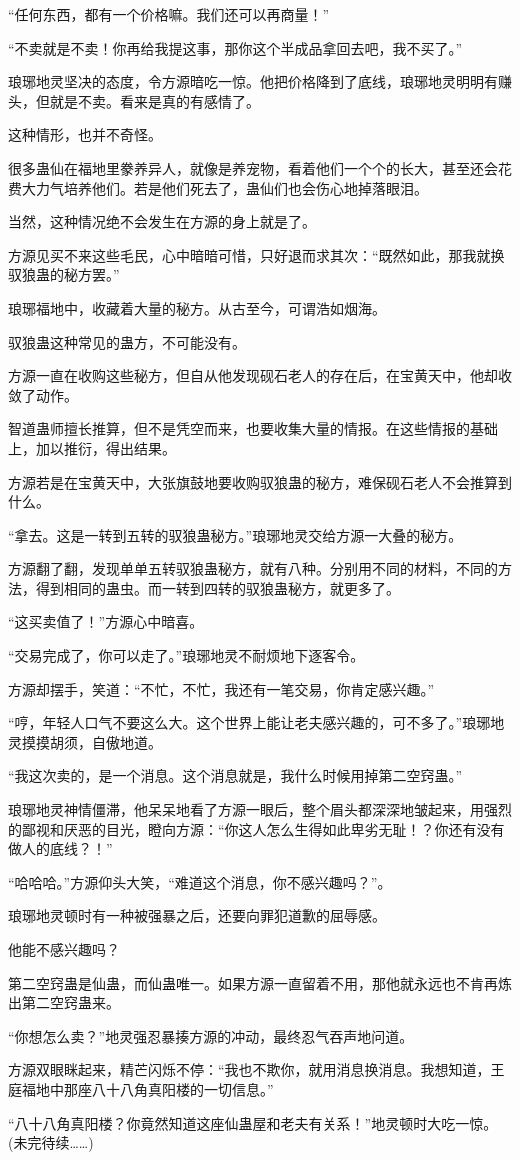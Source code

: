 \begin{this_body}
“任何东西，都有一个价格嘛。我们还可以再商量！”

“不卖就是不卖！你再给我提这事，那你这个半成品拿回去吧，我不买了。”

琅琊地灵坚决的态度，令方源暗吃一惊。他把价格降到了底线，琅琊地灵明明有赚头，但就是不卖。看来是真的有感情了。

这种情形，也并不奇怪。

很多蛊仙在福地里豢养异人，就像是养宠物，看着他们一个个的长大，甚至还会花费大力气培养他们。若是他们死去了，蛊仙们也会伤心地掉落眼泪。

当然，这种情况绝不会发生在方源的身上就是了。

方源见买不来这些毛民，心中暗暗可惜，只好退而求其次：“既然如此，那我就换驭狼蛊的秘方罢。”

琅琊福地中，收藏着大量的秘方。从古至今，可谓浩如烟海。

驭狼蛊这种常见的蛊方，不可能没有。

方源一直在收购这些秘方，但自从他发现砚石老人的存在后，在宝黄天中，他却收敛了动作。

智道蛊师擅长推算，但不是凭空而来，也要收集大量的情报。在这些情报的基础上，加以推衍，得出结果。

方源若是在宝黄天中，大张旗鼓地要收购驭狼蛊的秘方，难保砚石老人不会推算到什么。

“拿去。这是一转到五转的驭狼蛊秘方。”琅琊地灵交给方源一大叠的秘方。

方源翻了翻，发现单单五转驭狼蛊秘方，就有八种。分别用不同的材料，不同的方法，得到相同的蛊虫。而一转到四转的驭狼蛊秘方，就更多了。

“这买卖值了！”方源心中暗喜。

“交易完成了，你可以走了。”琅琊地灵不耐烦地下逐客令。

方源却摆手，笑道：“不忙，不忙，我还有一笔交易，你肯定感兴趣。”

“哼，年轻人口气不要这么大。这个世界上能让老夫感兴趣的，可不多了。”琅琊地灵摸摸胡须，自傲地道。

“我这次卖的，是一个消息。这个消息就是，我什么时候用掉第二空窍蛊。”

琅琊地灵神情僵滞，他呆呆地看了方源一眼后，整个眉头都深深地皱起来，用强烈的鄙视和厌恶的目光，瞪向方源：“你这人怎么生得如此卑劣无耻！？你还有没有做人的底线？！”

“哈哈哈。”方源仰头大笑，“难道这个消息，你不感兴趣吗？”。

琅琊地灵顿时有一种被强暴之后，还要向罪犯道歉的屈辱感。

他能不感兴趣吗？

第二空窍蛊是仙蛊，而仙蛊唯一。如果方源一直留着不用，那他就永远也不肯再炼出第二空窍蛊来。

“你想怎么卖？”地灵强忍暴揍方源的冲动，最终忍气吞声地问道。

方源双眼眯起来，精芒闪烁不停：“我也不欺你，就用消息换消息。我想知道，王庭福地中那座八十八角真阳楼的一切信息。”

“八十八角真阳楼？你竟然知道这座仙蛊屋和老夫有关系！”地灵顿时大吃一惊。(未完待续……)

\end{this_body}

